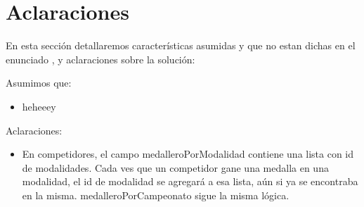 \section{Aclaraciones}

En esta secci\'on detallaremos características asumidas y que no estan dichas en el enunciado , y aclaraciones sobre la solución:

Asumimos que:

\begin{itemize}

\item heheeey

\end{itemize}

Aclaraciones:

\begin{itemize}

\item En competidores, el campo medalleroPorModalidad contiene una lista con id de modalidades. Cada ves que un competidor gane una medalla en una modalidad, el id de modalidad se agregará a esa lista, aún si ya se encontraba en la misma. medalleroPorCampeonato sigue la misma lógica.

\end{itemize}

